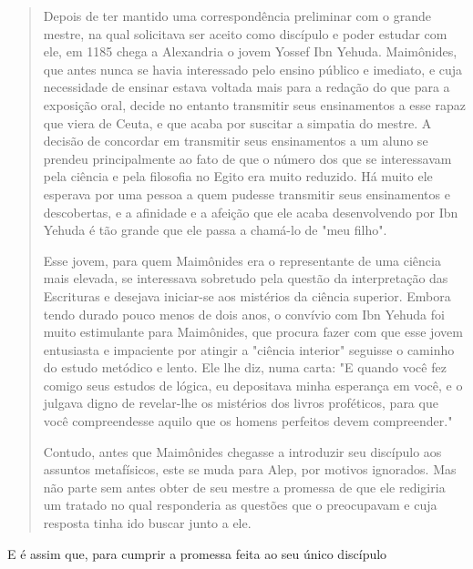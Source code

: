 \begin{quote}
Depois de ter mantido uma correspondência preliminar com o grande
mestre, na qual solicitava ser aceito como discípulo e poder estudar com
ele, em 1185 chega a Alexandria o jovem Yossef Ibn Yehuda. Maimônides,
que an­tes nunca se havia interessado pelo ensino público e imediato, e
cuja necessi­dade de ensinar estava voltada mais para a redação do que
para a exposição oral, decide no entanto transmitir seus ensinamentos a
esse rapaz que viera de Ceuta, e que acaba por suscitar a simpatia do
mestre. A decisão de concordar em transmitir seus ensinamentos a um
aluno se prendeu principalmente ao fato de que o número dos que se
interessavam pela ciência e pela filosofia no Egito era muito reduzido.
Há muito ele esperava por uma pessoa a quem pudesse trans­mitir seus
ensinamentos e descobertas, e a afinidade e a afeição que ele acaba
desenvolvendo por Ibn Yehuda é tão grande que ele passa a chamá-lo de
"meu filho".

Esse jovem, para quem Maimônides era o representante de uma ciência mais
elevada, se interessava sobretudo pela questão da interpretação das
Escrituras e desejava iniciar-se aos mistérios da ciência superior.
Embora tendo durado pouco menos de dois anos, o convívio com Ibn Yehuda
foi muito esti­mulante para Maimônides, que procura fazer com que esse
jovem entusiasta e impaciente por atingir a "ciência interior" seguisse
o caminho do estudo me­tódico e lento. Ele lhe diz, numa carta: "E
quando você fez comigo seus estu­dos de lógica, eu depositava minha
esperança em você, e o julgava digno de revelar-lhe os mistérios dos
livros proféticos, para que você compreendesse aqui­lo que os homens
perfeitos devem compreender."

Contudo, antes que Maimônides chegasse a introduzir seu discípulo aos
assuntos metafísicos, este se muda para Alep, por motivos ignorados. Mas
não parte sem antes obter de seu mestre a promessa de que ele redigiria
um tratado no qual responderia as questões que o preocupavam e cuja
resposta ti­nha ido buscar junto a ele.
\end{quote}

E é assim que, para cumprir a promessa feita ao seu único discípulo

